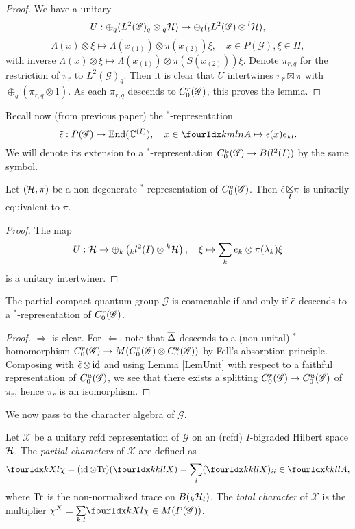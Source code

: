 \begin{proof}  We have a unitary \[U: \oplus_q (L^2(\mathscr{G})_q\otimes {}_q\mathcal{H} ) \rightarrow \oplus_l ({}_l L^2(\mathscr{G})\otimes {}^l\mathcal{H}),\]\[\Lambda(x)\otimes \xi \mapsto \Lambda(x_{(1)})\otimes \pi(x_{(2)})\xi,\quad x\in P(\mathscr{G}),\xi\in H,\] with inverse $\Lambda(x)\otimes \xi \mapsto \Lambda(x_{(1)})\otimes \pi(S(x_{(2)}))\xi$. Denote $\pi_{r,q}$ for the restriction of $\pi_r$ to $L^2(\mathscr{G})_q$. Then it is clear that $U$ intertwines $\pi_r\boxtimes \pi$ with $\oplus_q (\pi_{r,q}\otimes 1)$. As each $\pi_{r,q}$ descends to $C^{r}_{0}(\mathscr{G})$, this proves the lemma.
\end{proof} 

Recall now (from previous paper) the $^*$-representation \[\weps: P(\mathscr{G}) \rightarrow \End(\C^{(I)}), \quad x\in \Gr{A}{k}{l}{m}{n}\mapsto \epsilon(x) e_{kl}.\] We will denote its extension to a $^*$-representation $C^{u}_{0}(\mathscr{G})\rightarrow B(l^2(I))$ by the same symbol.

\begin{Lem}\label{LemUnit} Let $(\mathcal{H},\pi)$ be a non-degenerate $^*$-representation of $C^{u}_{0}(\mathscr{G})$. Then $\operatorname{\tilde{\epsilon}}\underset{I}{\boxtimes} \pi$ is unitarily equivalent to $\pi$.
\end{Lem} 
\begin{proof} The map \[U: \mathcal{H} \rightarrow \oplus_k \left({}_kl^2(I)\otimes {}^k\mathcal{H}\right),\quad \xi \mapsto \sum_k e_k\otimes \pi(\lambda_k)\xi\] is a unitary intertwiner.
\end{proof} 

\begin{Prop} The partial compact quantum group $\mathscr{G}$ is coamenable if and only if $\operatorname{\tilde{\epsilon}}$ descends to a $^*$-representation of $C^{r}_{0}(\mathscr{G})$.
\end{Prop} 
\begin{proof} $\Rightarrow$ is clear. For $\Leftarrow$, note that $\overline{\Delta}$ descends to a (non-unital) $^*$-homomorphism $C^{r}_{0}(\mathscr{G})\rightarrow M(C^{r}_{0}(\mathscr{G})\otimes C^{u}_{0}(\mathscr{G}))$ by Fell's absorption principle. Composing with $\operatorname{\tilde{\epsilon}}\otimes \operatorname{id}$ and using Lemma \ref{LemUnit} with respect to a faithful representation of $C^{u}_{0}(\mathscr{G})$, we see that there exists a splitting $C^{r}_{0}(\mathscr{G})\rightarrow C^{u}_{0}(\mathscr{G})$ of $\pi_r$, hence $\pi_r$ is an isomorphism.
\end{proof}
 
We now pass to the character algebra of $\mathscr{G}$.
 
 \begin{Def} Let $\mathscr{X}$ be a unitary rcfd representation of $\mathscr{G}$ on an (rcfd) $I$-bigraded Hilbert space $\mathcal{H}$. The \emph{partial characters} of $\mathscr{X}$ are defined as \[\Gr{\chi}{}{X}{k}{l} = (\id\otimes \Tr)(\Gr{X}{k}{l}{k}{l}) = \sum_i(\Gr{X}{k}{l}{k}{l})_{ii} \in \Gr{A}{k}{l}{k}{l},\] where $\mathrm{Tr}$ is the non-normalized trace on $B({}_{k}\mathcal{H}_{l})$. The \emph{total character} of $\mathscr{X}$ is the multiplier $\chi^X  =\underset{k,l}{\sum} \Gr{\chi}{}{X}{k}{l}\in M(P(\mathscr{G}))$.
 \end{Def}
 
